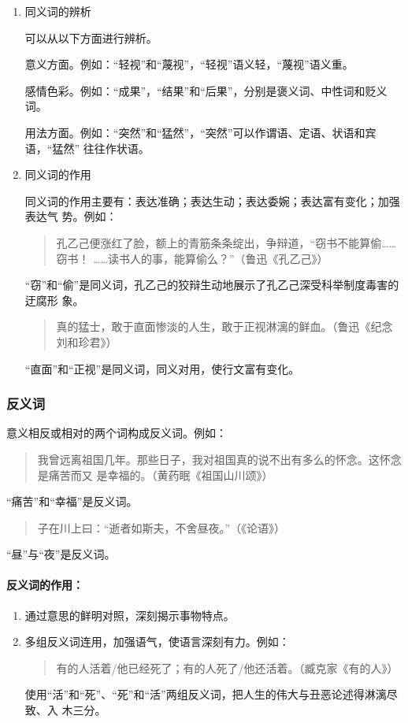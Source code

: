 \documentclass[final,oneside]{ctexbook}
\newenvironment{equotation}{\begin{quotation}\kaishu}{\end{quotation}}
\begin{document}
\begin{enumerate}
  \item 同义词的辨析

    可以从以下方面进行辨析。

    意义方面。例如：“轻视”和“蔑视”，“轻视”语义轻，“蔑视”语义重。

    感情色彩。例如：“成果”，“结果”和“后果”，分别是褒义词、中性词和贬义词。

    用法方面。例如：“突然”和“猛然”，“突然”可以作谓语、定语、状语和宾语，“猛然”
    往往作状语。

  \item 同义词的作用

    同义词的作用主要有：表达准确；表达生动；表达委婉；表达富有变化；加强表达气
    势。例如：

    \begin{equotation}
      孔乙己便涨红了脸，额上的青筋条条绽出，争辩道，“窃书不能算偷……窃书！
      ……读书人的事，能算偷么？”（鲁迅《孔乙己》）
    \end{equotation}
    “窃”和“偷”是同义词，孔乙己的狡辩生动地展示了孔乙己深受科举制度毒害的迂腐形
    象。

    \begin{equotation}
      真的猛士，敢于直面惨淡的人生，敢于正视淋漓的鲜血。（鲁迅《纪念刘和珍君》）
    \end{equotation}
    “直面”和“正视”是同义词，同义对用，使行文富有变化。
\end{enumerate}

\subsubsection{反义词}

意义相反或相对的两个词构成反义词。例如：
\begin{equotation}
  我曾远离祖国几年。那些日子，我对祖国真的说不出有多么的怀念。这怀念是痛苦而又
  是幸福的。（黄药眠《祖国山川颂》）
\end{equotation}
“痛苦”和“幸福”是反义词。
\begin{equotation}
  子在川上曰：“逝者如斯夫，不舍昼夜。”（《论语》）
\end{equotation}
“昼”与“夜”是反义词。

\paragraph{反义词的作用：}

\begin{enumerate}
  \item 通过意思的鲜明对照，深刻揭示事物特点。

  \item 多组反义词连用，加强语气，使语言深刻有力。例如：
    \begin{equotation}
      有的人活着/他已经死了；有的人死了/他还活着。（臧克家《有的人》）
    \end{equotation}
    使用“活”和“死”、“死”和“活”两组反义词，把人生的伟大与丑恶论述得淋漓尽致、入
    木三分。
\end{enumerate}
\end{document}
